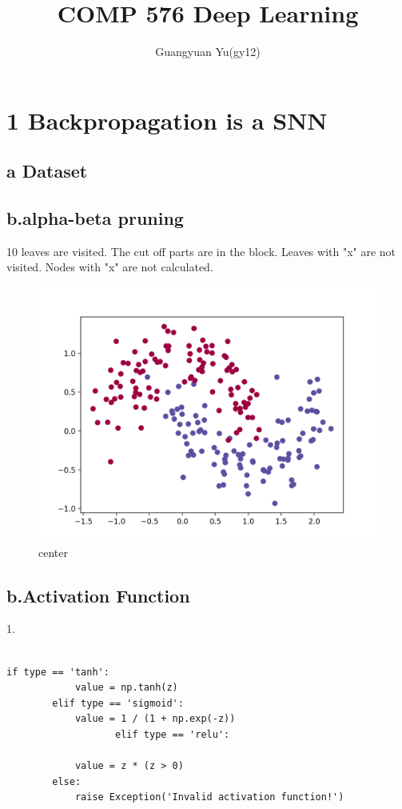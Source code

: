 \documentclass[12pt]{article}
\title{COMP 576 Deep Learning}
\author{Guangyuan Yu(gy12)}
\begin{document}
\maketitle

\section{1 Backpropagation is a SNN}
\subsection{a Dataset}




\subsection{b.alpha-beta pruning}
10 leaves are visited. The cut off parts are in the block. Leaves with "x" are not visited. Nodes with "x" are not calculated.

\begin{figure}[H]
  \caption{center}
  \centering
    \includegraphics[scale=0.2]{figure1.png}
\end{figure}


\subsection{b.Activation Function}
1. 
\begin{lstlisting}

if type == 'tanh':
            value = np.tanh(z)
        elif type == 'sigmoid':
            value = 1 / (1 + np.exp(-z))
                   elif type == 'relu':
            
            value = z * (z > 0)
        else:
            raise Exception('Invalid activation function!')
\end{lstlisting}
\end{document}
